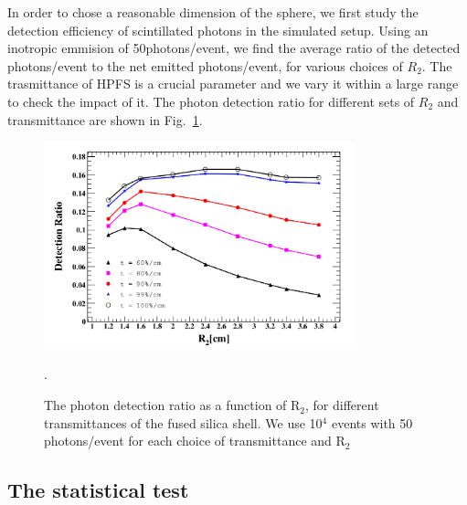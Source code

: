 In order to chose a reasonable dimension of the sphere, we first study the detection efficiency of 
scintillated photons in the simulated setup. Using an inotropic emmision of 50photons/event, we find 
the average ratio of the detected photons/event to the net emitted photons/event, for various choices 
of $R_{2}$. The trasmittance of HPFS is a crucial parameter and we vary it within a large range to 
check the impact of it. The photon detection ratio for different sets of $R_{2}$ and transmittance are 
shown in Fig.~\ref{fig:pdr}. 


\begin{figure}
   \centering
   \includegraphics[width=0.8\textwidth]{pdr.png}
   \caption{The photon detection ratio as a function of R$_{2}$, for different transmittances of 
   the fused silica shell. We use 10$^4$ events with 50 photons/event for each choice of transmittance 
   and R$_{2}$}. %
   \label{fig:pdr}
\end{figure}

\subsection{The statistical test}
\label{subsec:StatAnalysis}